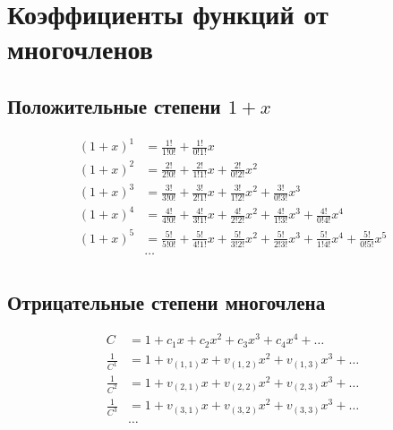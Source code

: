 
\section{Коэффициенты функций от многочленов}

\subsection{Положительные степени $ 1 + x $}

\begin{equation*}
\begin{aligned}
(1 + x)^1 &=
  \frac{1!}{1!0!} 
+ \frac{1!}{0!1!} x
\\
(1 + x)^2 &= 
  \frac{2!}{2!0!} 
+ \frac{2!}{1!1!} x 
+ \frac{2!}{0!2!} x^2
\\
(1 + x)^3 &=
  \frac{3!}{3!0!} 
+ \frac{3!}{2!1!} x 
+ \frac{3!}{1!2!} x^2 
+ \frac{3!}{0!3!} x^3
\\
(1 + x)^4 &=
  \frac{4!}{4!0!} 
+ \frac{4!}{3!1!} x 
+ \frac{4!}{2!2!} x^2 
+ \frac{4!}{1!3!} x^3 
+ \frac{4!}{0!4!} x^4
\\
(1 + x)^5 &=
  \frac{5!}{5!0!} 
+ \frac{5!}{4!1!} x 
+ \frac{5!}{3!2!} x^2 
+ \frac{5!}{2!3!} x^3 
+ \frac{5!}{1!4!} x^4
+ \frac{5!}{0!5!} x^5
\\
&\ldots
\\
\end{aligned}
\end{equation*}

\subsection{Отрицательные степени многочлена}

\begin{equation*}
\begin{aligned}
C &= 1 + c_1 x + c_2 x^2 + c_3 x^3 + c_4 x^4 + \ldots \\
\frac{1}{C^1} &= 1 + v_{(1,1)} x + v_{(1,2)} x^2 + v_{(1,3)} x^3 + \ldots 	\\ 
\frac{1}{C^2} &= 1 + v_{(2,1)} x + v_{(2,2)} x^2 + v_{(2,3)} x^3 + \ldots 	\\
\frac{1}{C^3} &= 1 + v_{(3,1)} x + v_{(3,2)} x^2 + v_{(3,3)} x^3 + \ldots 	\\ 
&\dots
\end{aligned}
\end{equation*}

